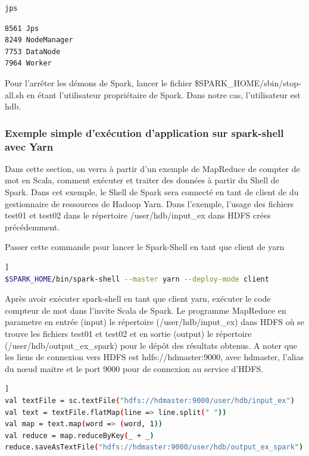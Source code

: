 \documentclass[12pt,english]{book}
\begin{document}
\begin{lstlisting}[language=bash, frame=single, basicstyle=\footnotesize]
jps
\end{lstlisting}

\begin{lstlisting}[language=bash, frame=single, basicstyle=\footnotesize]
8561 Jps
8249 NodeManager
7753 DataNode
7964 Worker
\end{lstlisting}

Pour l’arrêter les démons de Spark, lancer le fichier \$SPARK\_HOME/sbin/stop-all.sh en étant l’utilisateur propriétaire de Spark.
Dans notre cas, l’utilisateur est hdb. 

\subsubsection{Exemple simple d’exécution d’application sur spark-shell avec Yarn}

Dans cette section, on verra à partir d’un exemple de MapReduce de compter de mot en Scala, comment exécuter et traiter des données à partir du Shell de Spark.
Dans cet exemple, le Shell de Spark sera connecté en tant de client de du gestionnaire de ressources de Hadoop Yarn.
Dans l’exemple, l’usage des fichiers test01 et test02 dans le répertoire /user/hdb/input\_ex dans HDFS crées précédemment.

Passer cette commande pour lancer le Spark-Shell en tant que client de yarn

\begin{lstlisting}[language=bash, frame=single, basicstyle=\footnotesize, breaklines=true, postbreak=\mbox{\textcolor{red}{$\hookrightarrow$}\space}]]
$SPARK_HOME/bin/spark-shell --master yarn --deploy-mode client
\end{lstlisting}

Après avoir exécuter spark-shell en tant que client yarn, exécuter le code compteur de mot dans l’invite Scala de Spark.
Le programme MapReduce en parametre en entrée (input) le répertoire (/user/hdb/input\_ex) dans HDFS où se trouve les fichiers test01 et test02 et en sortie (output) le répertoire (/user/hdb/output\_ex\_spark) pour le dépôt des résultats obtenus.
A noter que les liens de connexion vers HDFS est hdfs://hdmaster:9000, avec hdmaster, l’alias du nœud maitre et le port 9000 pour de connexion au service d’HDFS.

\begin{lstlisting}[language=bash, frame=single, basicstyle=\footnotesize, breaklines=true, postbreak=\mbox{\textcolor{red}{$\hookrightarrow$}\space}]]
val textFile = sc.textFile("hdfs://hdmaster:9000/user/hdb/input_ex")
val text = textFile.flatMap(line => line.split(" "))
val map = text.map(word => (word, 1))
val reduce = map.reduceByKey(_ + _)
reduce.saveAsTextFile("hdfs://hdmaster:9000/user/hdb/output_ex_spark")
\end{lstlisting}
\end{document}
